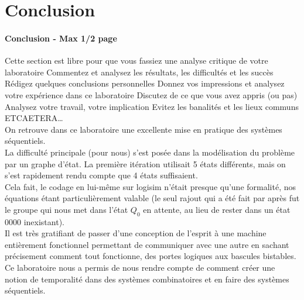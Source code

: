 \documentclass[a4paper]{article} %
\begin{document}
\section {Conclusion}
\begin{tcolorbox}[colframe=Monokaimagenta,colback=white, breakable, enhanced]
\paragraph{Conclusion - Max 1/2 page}
Cette section est libre pour que vous fassiez une analyse critique de votre laboratoire
Commentez et analysez 
les résultats, 
les difficultés et les succès
Rédigez quelques conclusions personnelles
Donnez vos impressions et analysez votre expérience dans ce laboratoire
Discutez de ce que vous avez appris (ou pas)
Analysez votre travail, votre implication
Evitez les banalités et les lieux communs
ETCAETERA…
\\
On retrouve dans ce laboratoire une excellente mise en pratique des systèmes séquentiels. \\
La difficulté principale (pour nous) s'est posée dans la modélisation du problème par un graphe d'état. La première itération utilisait 5 états différents, mais on s'est rapidement rendu compte que 4 états suffisaient. \\
Cela fait, le codage en lui-même sur logisim n'était presque qu'une formalité, nos équations étant particulièrement valable (le seul rajout qui a été fait par après fut le groupe qui nous met dans l'état $Q_0$ en attente, au lieu de rester dans un état 0000 inexistant). \\
Il est très gratifiant de passer d'une conception de l'esprit à une machine entièrement fonctionnel permettant de communiquer avec une autre en sachant précisement comment tout fonctionne, des portes logiques aux bascules bistables. \\
Ce laboratoire nous a permis de nous rendre compte de comment créer une notion de temporalité dans des systèmes combinatoires et en faire des systèmes séquentiels. \\

\end{tcolorbox}
\end{document}
